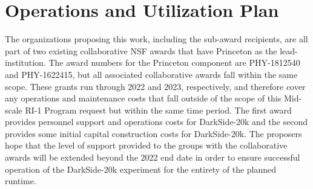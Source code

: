 \section{Operations and Utilization Plan}


The organizations proposing this work, including the sub-award recipients, are all part of two existing collaborative NSF awards that have Princeton as the lead-institution.  The award numbers for the Princeton component are PHY-1812540 and PHY-1622415, but all associated collaborative awards fall within the same scope.  These grants run through 2022 and 2023, respectively, and therefore cover any operations and maintenance costs that fall outside of the scope of this Mid-scale RI-1 Program request but within the same time period.  The first award provides personnel support and operations costs for DarkSide-20k and the second provides some initial capital construction costs for DarkSide-20k.  The proposers hope that the level of support provided to the groups with the collaborative awards will be extended beyond the 2022 end date in order to ensure successful operation of the DarkSide-20k experiment for the entirety of the planned runtime.

